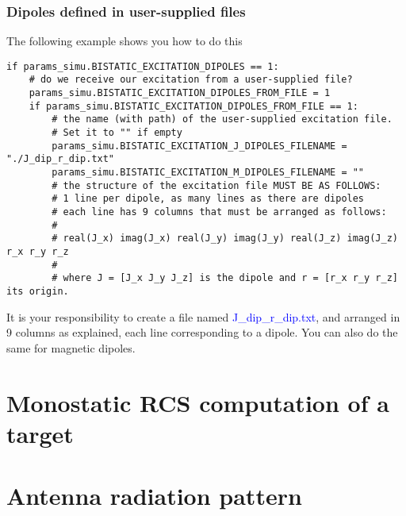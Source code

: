 \documentclass[a4paper,10pt]{book}
\newcommand{\file}[1] {\textcolor{blue}{\textsf{#1}}}
\begin{document}
\subsubsection{Dipoles defined in user-supplied files}
%
\par
The following example shows you how to do this
\begin{verbatim}
if params_simu.BISTATIC_EXCITATION_DIPOLES == 1:
    # do we receive our excitation from a user-supplied file?
    params_simu.BISTATIC_EXCITATION_DIPOLES_FROM_FILE = 1
    if params_simu.BISTATIC_EXCITATION_DIPOLES_FROM_FILE == 1:
        # the name (with path) of the user-supplied excitation file. 
        # Set it to "" if empty
        params_simu.BISTATIC_EXCITATION_J_DIPOLES_FILENAME = "./J_dip_r_dip.txt"
        params_simu.BISTATIC_EXCITATION_M_DIPOLES_FILENAME = ""
        # the structure of the excitation file MUST BE AS FOLLOWS:
        # 1 line per dipole, as many lines as there are dipoles
        # each line has 9 columns that must be arranged as follows:
        #
        # real(J_x) imag(J_x) real(J_y) imag(J_y) real(J_z) imag(J_z) r_x r_y r_z
        #
        # where J = [J_x J_y J_z] is the dipole and r = [r_x r_y r_z] its origin.
\end{verbatim}
It is your responsibility to create a file named \file{J\_dip\_r\_dip.txt}, and arranged in 9 columns as explained, each line corresponding to a dipole. You can also do the same for magnetic dipoles.


\section{Monostatic RCS computation of a target}
%
\par



\section{Antenna radiation pattern}
%
\par
\end{document}
